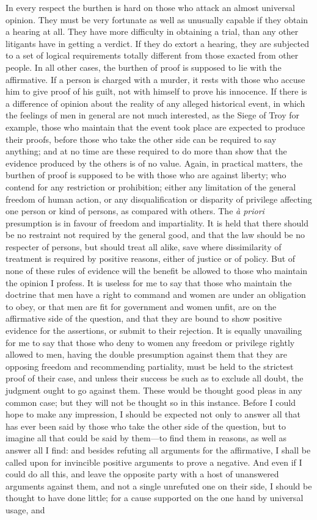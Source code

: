 \documentclass[12pt]{report}
\begin{document}
In every respect the burthen is hard on those who attack an almost universal opinion. They must be very fortunate as well as unusually capable if they obtain a hearing at all. They have more difficulty in obtaining a trial, than any other litigants have in getting a verdict. If they do extort a hearing, they are subjected to a set of logical requirements totally different from those exacted from other people. In all other cases, the burthen of proof is supposed to lie with the affirmative. If a person is charged with a murder, it rests with those who accuse him to give proof of his guilt, not with himself to prove his innocence. If there is a difference of opinion about the reality of any alleged historical event, in which the feelings of men in general are not much interested, as the Siege of Troy for example, those who maintain that the event took place are expected to produce their proofs, before those who take the other side can be required to say anything; and at no time are these required to do more than show that the evidence produced by the others is of no value. Again, in practical matters, the burthen of proof is supposed to be with those who are against liberty; who contend for any restriction or prohibition; either any limitation of the general freedom of human action, or any disqualification or disparity of privilege affecting one person or kind of persons, as compared with others. The \emph{à priori} presumption is in favour of freedom and impartiality. It is held that there should be no restraint not required by the general good, and that the law should be no respecter of persons, but should treat all alike, save where dissimilarity of treatment is required by positive reasons, either of justice or of policy. But of none of these rules of evidence will the benefit be allowed to those who maintain the opinion I profess. It is useless for me to say that those who maintain the doctrine that men have a right to command and women are under an obligation to obey, or that men are fit for government and women unfit, are on the affirmative side of the question, and that they are bound to show positive evidence for the assertions, or submit to their rejection. It is equally unavailing for me to say that those who deny to women any freedom or privilege rightly allowed to men, having the double presumption against them that they are opposing freedom and recommending partiality, must be held to the strictest proof of their case, and unless their success be such as to exclude all doubt, the judgment ought to go against them. These would be thought good pleas in any common case; but they will not be thought so in this instance. Before I could hope to make any impression, I should be expected not only to answer all that has ever been said by those who take the other side of the question, but to imagine all that could be said by them—to find them in reasons, as well as answer all I find: and besides refuting all arguments for the affirmative, I shall be called upon for invincible positive arguments to prove a negative. And even if I could do all this, and leave the opposite party with a host of unanswered arguments against them, and not a single unrefuted one on their side, I should be thought to have done little; for a cause supported on the one hand by universal usage, and 
\end{document}

